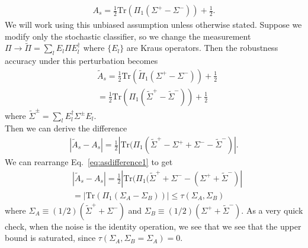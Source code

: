 \documentclass[onecolumn,prx, superscriptaddress,longbibliography,margin=1mm 11pt]{revtex4-2}
\begin{document}
\begin{align}
    A_s=\frac{1}{2}\text{Tr}(\Pi_1(\Sigma^+-\Sigma^-))+\frac{1}{2}.
\end{align}
We will work using this unbiased assumption unless otherwise stated. Suppose we modify only the stochastic classifier, so we change the measurement $\Pi \rightarrow \tilde{\Pi}=\sum_l E_l \Pi E_l^{\dagger}$ where $\{E_l\}$ are Kraus operators. Then the robustness accuracy under this perturbation becomes 
\begin{align}
   &\tilde{A}_s=\frac{1}{2}\text{Tr}(\tilde{\Pi}_1(\Sigma^+-\Sigma^-))+\frac{1}{2} \nonumber \\
   &=\frac{1}{2}\text{Tr}(\Pi_1(\tilde{\Sigma}^+-\tilde{\Sigma}^-))+\frac{1}{2}
\end{align}
where $\tilde{\Sigma}^{\pm}=\sum_l E^{\dagger}_l \Sigma^{\pm}E_l$. \\

Then we can derive the difference
\begin{align} \label{eq:asdifference1}
    |\tilde{A}_s-A_s|=\frac{1}{2}|\text{Tr}(\Pi_1(\tilde{\Sigma}^+-\Sigma^++\Sigma^--\tilde{\Sigma}^-)|.
\end{align}
We can rearrange Eq.~\eqref{eq:asdifference1} to get 
\begin{align}
    & |\tilde{A}_s-A_s|=\frac{1}{2}|\text{Tr}(\Pi_1(\tilde{\Sigma}^++\Sigma^--(\Sigma^++\tilde{\Sigma}^-)| \nonumber \\
   & =|\text{Tr}(\Pi_1 (\Sigma_A-\Sigma_B))| \leq \tau(\Sigma_A, \Sigma_B)
\end{align}
where $\Sigma_A \equiv (1/2)(\tilde{\Sigma}^++\Sigma^-)$ and $\Sigma_B \equiv (1/2)(\Sigma^++\tilde{\Sigma}^-)$. As a very quick check, when the noise is the identity operation, we see that we see that the upper bound is saturated, since $\tau(\Sigma_A, \Sigma_B=\Sigma_A)=0$.

%

%

\end{document}
